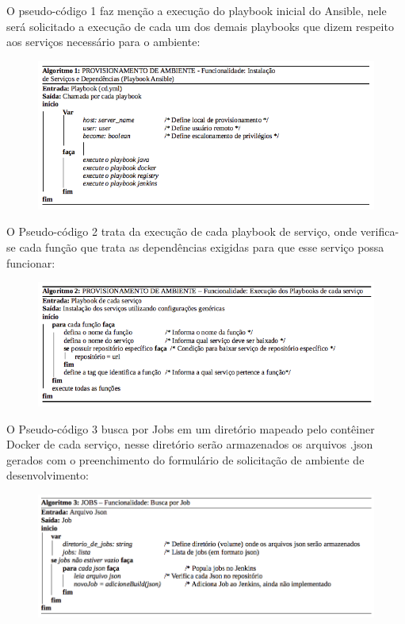 O pseudo-código 1 faz menção a execução do playbook inicial do Ansible, nele será solicitado a execução de cada um dos demais playbooks que dizem respeito aos serviços necessário para o ambiente:

\begin{figure}[htb]
	\centering
	\includegraphics[width=1\linewidth]{imagens/algoritmo1}
\end{figure}

    \vspace*{2cm}

O Pseudo-código 2 trata da execução de cada playbook de serviço, onde verifica-se cada função que trata as dependências exigidas para que esse serviço possa funcionar:
\begin{figure}[htb]
	\centering
	\includegraphics[width=1\linewidth]{imagens/algoritmo2}
\end{figure}

    \pagebreak[4]

O Pseudo-código 3 busca por Jobs em um diretório mapeado pelo contêiner Docker de cada serviço, nesse diretório serão armazenados os arquivos .json gerados com o preenchimento do formulário de solicitação de ambiente de desenvolvimento:	
\begin{figure}[htb]
	\centering
	\includegraphics[width=1\linewidth]{imagens/algoritmo3}
\end{figure}

